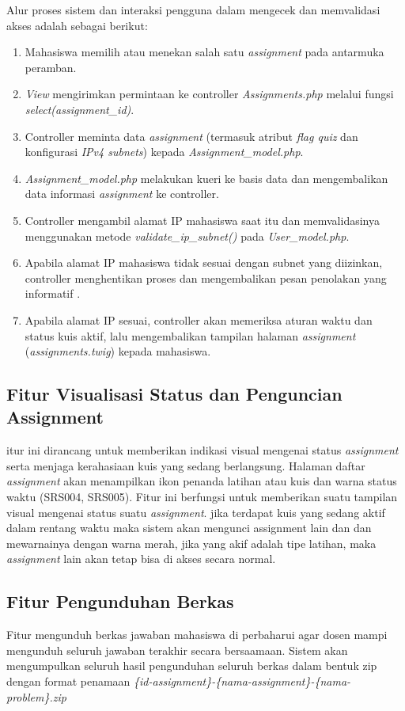 Alur proses sistem dan interaksi pengguna dalam mengecek dan memvalidasi akses adalah sebagai berikut:
\begin{enumerate}
    \item Mahasiswa memilih atau menekan salah satu \textit{assignment} pada antarmuka peramban.
    \item \textit{View} mengirimkan permintaan ke controller \textit{Assignments.php} melalui fungsi \textit{select(assignment\_id)}.
    \item Controller meminta data \textit{assignment} (termasuk atribut \textit{flag quiz} dan konfigurasi \textit{IPv4 subnets}) kepada \textit{Assignment\_model.php}.
    \item \textit{Assignment\_model.php} melakukan kueri ke basis data dan mengembalikan data informasi \textit{assignment} ke controller.
    \item Controller mengambil alamat IP mahasiswa saat itu dan memvalidasinya menggunakan metode \textit{validate\_ip\_subnet()} pada \textit{User\_model.php}.
    \item Apabila alamat IP mahasiswa tidak sesuai dengan subnet yang diizinkan, controller menghentikan proses dan mengembalikan pesan penolakan yang informatif .
    \item Apabila alamat IP sesuai, controller akan memeriksa aturan waktu dan status kuis aktif, lalu mengembalikan tampilan halaman \textit{assignment} (\textit{assignments.twig}) kepada mahasiswa.
\end{enumerate}


\subsection{Fitur Visualisasi Status dan Penguncian Assignment}
itur ini dirancang untuk memberikan indikasi visual mengenai status \textit{assignment} serta menjaga kerahasiaan kuis yang sedang berlangsung. Halaman daftar \textit{assignment} akan menampilkan ikon penanda latihan atau  kuis dan warna status waktu (SRS004, SRS005). 
Fitur ini berfungsi untuk memberikan suatu tampilan visual mengenai status suatu \textit{assignment}. jika terdapat kuis yang sedang aktif dalam rentang waktu maka sistem akan mengunci assignment lain dan  dan mewarnainya dengan warna merah, jika yang akif adalah tipe latihan, maka \textit{assignment} lain akan tetap bisa di akses secara normal.

\subsection{Fitur Pengunduhan Berkas}
Fitur mengunduh berkas jawaban mahasiswa di perbaharui agar dosen mampi mengunduh seluruh jawaban terakhir secara bersaamaan. Sistem akan mengumpulkan seluruh hasil pengunduhan seluruh berkas dalam bentuk zip dengan format penamaan \textit{\{id-assignment\}-\{nama-assignment\}-\{nama-problem\}.zip}